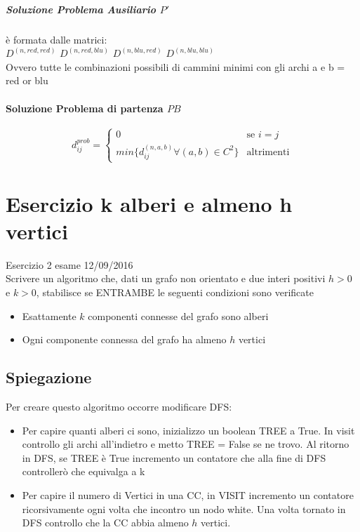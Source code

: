 \documentclass[12pt, a4paper, openany]{book}
\begin{document}
	\subparagraph{Soluzione Problema Ausiliario $P'$} è formata dalle matrici:\\
$D^{(n,red,red)}$ $D^{(n,red,blu)}$ $D^{(n,blu,red)}$ $D^{(n,blu,blu)}$ \\
	Ovvero tutte le combinazioni possibili di cammini minimi con gli archi a e b = red or blu

	\paragraph{Soluzione Problema di partenza $PB$}
	\begin{equation*}
		d^{prob}_{ij} = \begin{cases}
			0                                             & \text{se $i=j$}   \\
			min\{d^{(n,a,b)}_{ij} \forall (a,b) \in C^2\} & \text{altrimenti}
		\end{cases}
	\end{equation*}

	\section{Esercizio k alberi e almeno h vertici} Esercizio 2 esame 12/09/2016\\
	Scrivere un algoritmo che, dati un grafo non orientato e due interi positivi $h>0$ e $k>0$, stabilisce se ENTRAMBE le seguenti condizioni sono verificate
	\begin{itemize}
		\item Esattamente $k$ componenti connesse del grafo sono alberi
		\item Ogni componente connessa del grafo ha almeno $h$ vertici
	\end{itemize}

	\subsection*{Spiegazione}
	Per creare questo algoritmo occorre modificare DFS:
	\begin{itemize}
		\item Per capire quanti alberi ci sono, inizializzo un boolean TREE a True. In visit controllo gli archi all'indietro e metto TREE = False se ne trovo. Al ritorno in DFS, se TREE è True incremento un contatore che alla fine di DFS controllerò che equivalga a k
		\item Per capire il numero di Vertici in una CC, in VISIT incremento un contatore ricorsivamente ogni volta che incontro un nodo white. Una volta tornato in DFS controllo che la CC abbia almeno $h$ vertici.
	\end{itemize}
\end{document}
